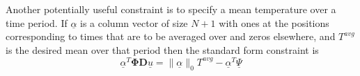 \documentclass[11pt]{article}
\begin{document}
Another potentially useful constraint is to specify a mean temperature over a time period. If $\underline{\alpha}$ is a column vector of size $N+1$ with ones at the positions corresponding to times that are to be averaged over and zeros elsewhere, and $T^{avg}$ is the desired mean over that period then the standard form constraint is
\begin{equation}
\underline{\alpha}^{T} \mathbf{\Phi} \mathbf{D} \underline{u} = \|\underline{\alpha}\|_{0} T^{avg} -\underline{\alpha}^{T} \underline{\Psi}
\end{equation}
\end{document}
